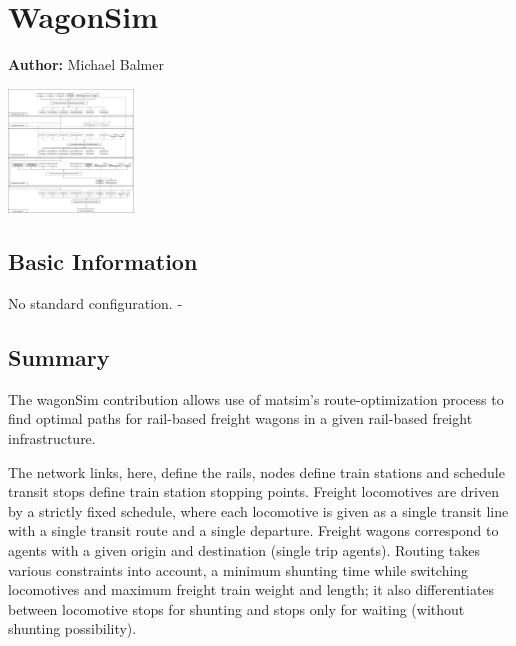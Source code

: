 \chapter{WagonSim}
\label{ch:wagonSim}

\hfill \textbf{Author:} Michael Balmer

\begin{center} \includegraphics[width=0.25\textwidth, angle=0]{extending/figures/wagonsim/wagonSimProcessChain.png} \end{center}


\section{Basic Information}
\createStandardInformationBasic%
{}%
{}%
{No standard configuration.}
{-}

\section{Summary}
The wagonSim \gls{contribution} allows use of \gls{matsim}'s route-optimization process to find optimal paths for rail-based freight wagons in a given rail-based freight infrastructure.

The network links, here, define the rails, nodes define train stations and schedule transit stops define train station stopping points. 
Freight locomotives are driven by a strictly fixed schedule, where each locomotive is given as a single transit line with a single transit route and a single departure. 
Freight wagons correspond to agents with a given origin and destination (single trip agents). 
Routing takes various constraints into account, \ie a minimum shunting time while switching locomotives and maximum freight train weight and length; it also differentiates between locomotive stops for shunting and stops  only for waiting (without shunting possibility).

